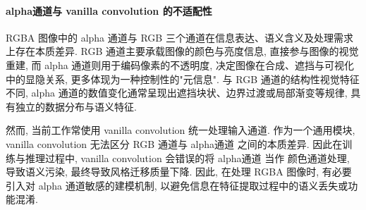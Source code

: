 \paragraph{alpha通道与 vanilla convolution 的不适配性}

RGBA 图像中的 alpha 通道与 RGB 三个通道在信息表达、语义含义及处理需求上存在本质差异. RGB 通道主要承载图像的颜色与亮度信息, 直接参与图像的视觉重建, 而 alpha 通道则用于编码像素的不透明度, 决定图像在合成、遮挡与可视化中的显隐关系, 更多体现为一种控制性的"元信息". 与 RGB 通道的结构性视觉特征不同, alpha 通道的数值变化通常呈现出遮挡块状、边界过渡或局部渐变等规律, 具有独立的数据分布与语义特征. 

然而, 当前工作常使用 vanilla convolution 统一处理输入通道. 作为一个通用模块, vanilla convolution 无法区分 RGB 通道与 alpha通道 之间的本质差异. 因此在训练与推理过程中, vanilla convolution 会错误的将 alpha通道 当作 颜色通道处理, 导致语义污染, 最终导致风格迁移质量下降. 因此, 在处理 RGBA 图像时, 有必要引入对 alpha 通道敏感的建模机制, 以避免信息在特征提取过程中的语义丢失或功能混淆.